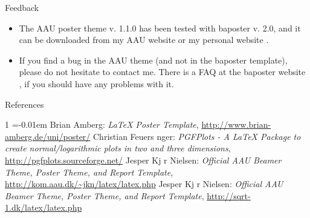\documentclass{article}
\begin{document}
\begin{poster}
\begin{posterbox}[name=feedback,column=2,below=problems]{Feedback}
  \begin{itemize}
    \item The AAU poster theme v. 1.1.0 has been tested with baposter v. 2.0, and it can be downloaded from my AAU website \cite{jknaau} or my personal website \cite{jknsqrt-1}.
    \item If you find a bug in the AAU theme (and not in the baposter template), please do not hesitate to contact me. There is a FAQ at the baposter website \cite{baposter}, if you should have any problems with it.
  \end{itemize}
\end{posterbox}

\begin{posterbox}[name=refs,column=2,below=feedback,above=bottom]{References}


\begin{thebibliography}{1}%
\itemsep=-0.01em%
\setlength{\baselineskip}{0.4em}%
 Brian Amberg: \emph{LaTeX Poster Template}, \url{http://www.brian-amberg.de/uni/poster/} 
 Christian Feuers nger: \emph{PGFPlots - A LaTeX Package to create normal/logarithmic plots in two and three dimensions}, \url{http://pgfplots.sourceforge.net/} 
 Jesper Kj r Nielsen: \emph{Official AAU Beamer Theme, Poster Theme, and Report Template}, \url{http://kom.aau.dk/~jkn/latex/latex.php}
 Jesper Kj r Nielsen: \emph{Official AAU Beamer Theme, Poster Theme, and Report Template}, \url{http://sqrt-1.dk/latex/latex.php}
\end{thebibliography}


%  
%   
\end{posterbox}

\end{poster}
\end{document}

